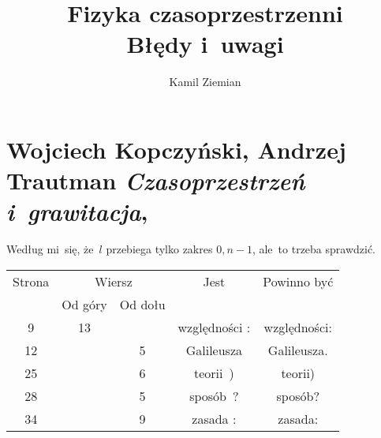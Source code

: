 \documentclass[a4paper,11pt]{article}
\title{Fizyka czasoprzestrzenni \\
  {\Large Błędy i~uwagi}}
\author{Kamil Ziemian}
\numberwithin{equation}{section}
\begin{document}





\maketitle





\section{Wojciech Kopczyński, Andrzej Trautman
  \textit{Czasoprzestrzeń i~grawitacja},
  \cite{KopczynskiTrautmanCzasoprzetrzenIGrawitacja1984}}

\label{sec:Uwagi-ogolne}




\vspace{0em}


\noindent
{} Według mi~się, że~$l$ przebiega tylko zakres $0, n - 1$, ale~to
trzeba sprawdzić.

\VerSpaceFour





\noindent
{}

\VerSpaceFour





\noindent
{}





\newpage



\begin{center}

  \begin{tabular}{|c|c|c|c|c|}
    \hline
    Strona & \multicolumn{2}{c|}{Wiersz} & Jest
                              & Powinno być \\ \cline{2-3}
    & Od góry & Od dołu & & \\
    \hline
    9   & 13 & & względności : & względności: \\
    12  & &  5 & Galileusza & Galileusza. \\
    25  & &  6 & teorii~) & teorii) \\
    28  & &  5 & sposób~? & sposób? \\
    34  & &  9 & zasada : & zasada: \\
    \hline
  \end{tabular}

\end{center}
\end{document}

